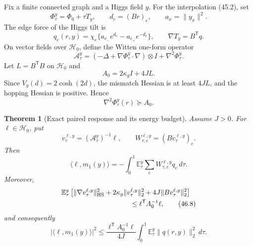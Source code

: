 \documentclass[11pt]{article}
\newtheorem{theorem}{Theorem}[section]
\theoremstyle{remark}
\begin{document}
Fix a finite connected graph and a Higgs field \(y\).  For the
interpolation (45.2), set
\[
 \Phi_\tau^y=\Phi_0+\tau T_y,\qquad
 d_e=(Br)_e,\qquad a_x=\|y_x\|^2.                  \tag{46.1}
\]
The edge force of the Higgs tilt is
\[
 q_e(r,y)=
 \chi_e\{a_{e_-}e^{d_e}-a_{e_+}e^{-d_e}\},
 \qquad
 \nabla T_y=B^{\mathsf T}q.                       \tag{46.2}
\]
On vector fields over \(\mathcal H_0\), define the Witten one-form
operator
\[
 \mathscr A_\tau^y
 =
 \left(-\Delta+\nabla\Phi_\tau^y\mathbin{\cdot}\nabla\right)
 \otimes I+\nabla^2\Phi_\tau^y.                   \tag{46.3}
\]
Let \(L=B^{\mathsf T}B\) on \(\mathcal H_0\) and
\[
 A_0=2\kappa_gI+4JL.                              \tag{46.4}
\]
Since \(V_g(d)=2\cosh(2d)\), the mismatch Hessian is at least
\(4JL\), and the hopping Hessian is positive.  Hence
\[
 \nabla^2\Phi_\tau^y(r)\succeq A_0.               \tag{46.5}
\]

\begin{theorem}[Exact paired response and its energy budget]
\label{thm:v17v46-witten}
Assume \(J>0\).  For \(\ell\in\mathcal H_0\), put
\[
 v_\tau^{\ell,y}
 =(\mathscr A_\tau^y)^{-1}\ell,\qquad
 W_{\tau,e}^{\ell,y}=(Bv_\tau^{\ell,y})_e.         \tag{46.6}
\]
Then
\[
\boxed{
 \langle\ell,m_1(y)\rangle
 =
 -\int_0^1
 \mathbb E_\tau^y
 \sum_eW_{\tau,e}^{\ell,y}q_e\,d\tau.}            \tag{46.7}
\]
Moreover,
\[
\begin{aligned}
 &\mathbb E_\tau^y\left[
 \|\nabla v_\tau^{\ell,y}\|_{\rm HS}^2
 +2\kappa_g\|v_\tau^{\ell,y}\|_2^2
 +4J\|Bv_\tau^{\ell,y}\|_2^2
 \right]\\
 &\hspace{35mm}\leq
 \ell^{\mathsf T}A_0^{-1}\ell,                    \tag{46.8}
\end{aligned}
\]
and consequently
\[
\boxed{
 |\langle\ell,m_1(y)\rangle|^2
 \leq
 \frac{\ell^{\mathsf T}A_0^{-1}\ell}{4J}
 \int_0^1\mathbb E_\tau^y\|q(r,y)\|_2^2\,d\tau.}  \tag{46.9}
\]
\end{theorem}
\end{document}
